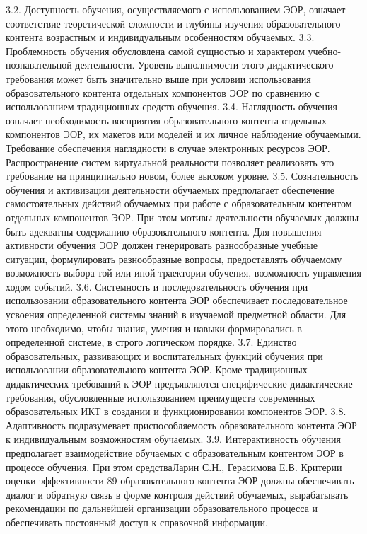 3.2. Доступность обучения, осуществляемого с использованием ЭОР, означает соответствие теоретической сложности и глубины изучения образовательного контента возрастным и индивидуальным особенностям обучаемых.
3.3. Проблемность обучения обусловлена самой сущностью и характером учебно-познавательной деятельности. Уровень выполнимости этого дидактического требования может быть значительно выше при условии использования образовательного контента отдельных компонентов ЭОР по сравнению с использованием традиционных средств обучения.
3.4. Наглядность обучения означает необходимость восприятия образовательного контента отдельных компонентов ЭОР, их макетов или моделей и их личное наблюдение обучаемыми. Требование обеспечения наглядности в случае электронных ресурсов ЭОР. Распространение систем виртуальной реальности позволяет реализовать это требование на принципиально новом, более высоком уровне.
3.5. Сознательность обучения и активизации деятельности обучаемых предполагает обеспечение самостоятельных действий обучаемых при работе с образовательным контентом отдельных компонентов ЭОР. При этом мотивы деятельности обучаемых должны быть адекватны содержанию образовательного контента. Для повышения активности обучения ЭОР должен генерировать разнообразные учебные ситуации, формулировать разнообразные вопросы, предоставлять обучаемому возможность выбора той или иной траектории обучения, возможность управления ходом событий.
3.6. Системность и последовательность обучения при использовании
образовательного контента ЭОР обеспечивает последовательное усвоения
определенной системы знаний в изучаемой предметной области. Для этого
необходимо, чтобы знания, умения и навыки формировались в определенной системе, в строго логическом порядке.
3.7. Единство образовательных, развивающих и воспитательных функций обучения при использовании образовательного контента ЭОР.
Кроме традиционных дидактических требований к ЭОР предъявляются
специфические дидактические требования, обусловленные использованием
преимуществ современных образовательных ИКТ в создании и функционировании компонентов ЭОР.
3.8. Адаптивность подразумевает приспособляемость образовательного
контента ЭОР к индивидуальным возможностям обучаемых.
3.9. Интерактивность обучения предполагает взаимодействие обучаемых
с образовательным контентом ЭОР в процессе обучения. При этом средстваЛарин С.Н., Герасимова Е.В. Критерии оценки эффективности
89
образовательного контента ЭОР должны обеспечивать диалог и обратную
связь в форме контроля действий обучаемых, вырабатывать рекомендации по
дальнейшей организации образовательного процесса и обеспечивать постоянный доступ к справочной информации.
